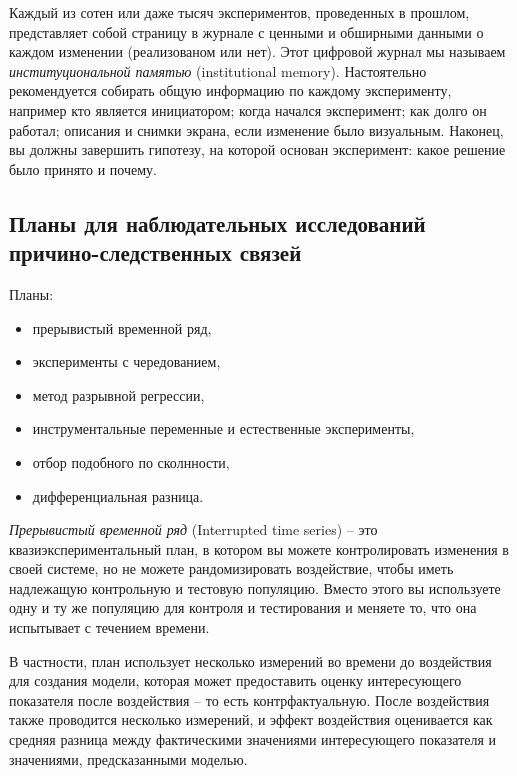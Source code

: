 \documentclass[%
	11pt,
	a4paper,
	utf8,
		]{article}
\begin{document}
Каждый из сотен или даже тысяч экспериментов, проведенных в прошлом, представляет собой страницу в журнале с ценными и обширными данными о каждом изменении (реализованом или нет). Этот цифровой журнал мы называем \emph{институциональной памятью} (institutional memory). Настоятельно рекомендуется собирать общую информацию по каждому эксперименту, например кто является инициатором; когда начался эксперимент; как долго он работал; описания и снимки экрана, если изменение было визуальным. Наконец, вы должны завершить гипотезу, на которой основан эксперимент: какое решение было принято и почему.

\subsection{Планы для наблюдательных исследований причино-следственных связей}

Планы:
\begin{itemize}
	\item прерывистый временной ряд,
	
	\item эксперименты с чередованием,
	
	\item метод разрывной регрессии,
	
	\item инструментальные переменные и естественные эксперименты,
	
	\item отбор подобного по сколнности,
	
	\item дифференциальная разница.
\end{itemize}

\emph{Прерывистый временной ряд} (Interrupted time series) -- это квазиэкспериментальный план, в котором вы можете контролировать изменения в своей системе, но не можете рандомизировать воздействие, чтобы иметь надлежащую контрольную и тестовую популяцию. Вместо этого вы используете одну и ту же популяцию для контроля и тестирования и меняете то, что она испытывает с течением времени.

В частности, план использует несколько измерений во времени до воздействия для создания модели, которая может предоставить оценку интересующего показателя после воздействия -- то есть контрфактуальную. После воздействия также проводится несколько измерений, и эффект воздействия оценивается как средняя разница между фактическими значениями интересующего показателя и значениями, предсказанными моделью.
\end{document}
